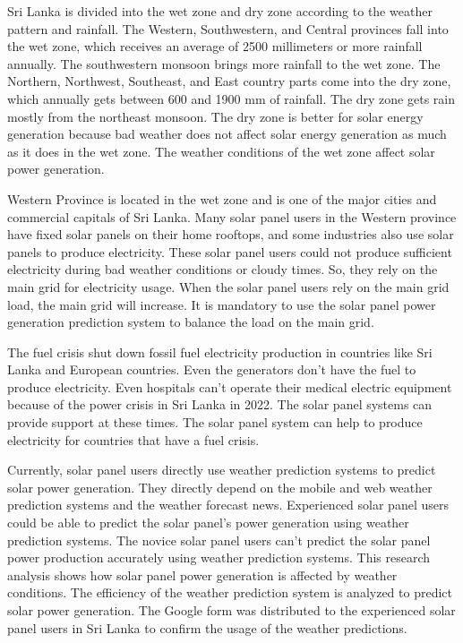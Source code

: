 \documentclass[conference]{IEEEtran}
\begin{document}
Sri Lanka is divided into the wet zone and dry zone according to the weather pattern and rainfall. The Western, Southwestern, and Central provinces fall into the wet zone, which receives an average of 2500 millimeters or more rainfall annually. The southwestern monsoon brings more rainfall to the wet zone. The Northern, Northwest, Southeast, and East country parts come into the dry zone, which annually gets between 600 and 1900 mm of rainfall\cite{geo}. The dry zone gets rain mostly from the northeast monsoon. The dry zone is better for solar energy generation because bad weather does not affect solar energy generation as much as it does in the wet zone. The weather conditions of the wet zone affect solar power generation.



Western Province is located in the wet zone and is one of the major cities and commercial capitals of Sri Lanka. Many solar panel users in the Western province have fixed solar panels on their home rooftops, and some industries also use solar panels to produce electricity. These solar panel users could not produce sufficient electricity during bad weather conditions or cloudy times. So, they rely on the main grid for electricity usage. When the solar panel users rely on the main grid load, the main grid will increase. It is mandatory to use the solar panel power generation prediction system to balance the load on the main grid.

The fuel crisis shut down fossil fuel electricity production in countries like Sri Lanka and European countries. Even the generators don't have the fuel to produce electricity. Even hospitals can't operate their medical electric equipment because of the power crisis in Sri Lanka in 2022. The solar panel systems can provide support at these times. The solar panel system can help to produce electricity for countries that have a fuel crisis. 

Currently, solar panel users directly use weather prediction systems to predict solar power generation. They directly depend on the mobile and web weather prediction systems and the weather forecast news. Experienced solar panel users could be able to predict the solar panel's power generation using weather prediction systems. The novice solar panel users can't predict the solar panel power production accurately using weather prediction systems. This research analysis shows how solar panel power generation is affected by weather conditions. The efficiency of the weather prediction system is analyzed to predict solar power generation. The Google form was distributed to the experienced solar panel users in Sri Lanka to confirm the usage of the weather predictions.
\end{document}
